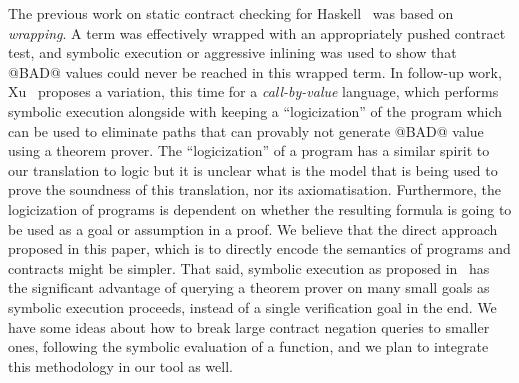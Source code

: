 The previous work on static contract checking for Haskell~\cite{xu+:contracts}
was based on {\em wrapping}. A term was effectively wrapped
with an appropriately pushed contract test, and symbolic execution or aggressive inlining was used to show that @BAD@ values could
never be reached in this wrapped term.
In follow-up work, Xu~\cite{Xu:2012:HCC:2103746.2103767} proposes a variation, this time for a
{\em call-by-value} language, which performs symbolic execution alongside with
keeping a ``logicization'' of the program which can be used to eliminate paths that can
provably not generate @BAD@ value using a theorem prover. The ``logicization'' of a
program has a similar spirit to our translation to logic but
it is unclear what is the
model that is being used to prove the soundness of this translation, nor its
axiomatisation.
Furthermore, the logicization of programs is dependent on whether
the resulting formula is going to be used as a goal or assumption in a proof. We believe
that the direct approach proposed in this paper, which is to directly encode the semantics
of programs and contracts might be simpler. That said, symbolic execution as proposed
in~\cite{Xu:2012:HCC:2103746.2103767} has the significant advantage of querying a
theorem prover on many small goals as symbolic execution proceeds, instead of a
single verification goal in the end. We have some ideas about how to break large
contract negation queries to smaller ones, following the symbolic evaluation of
a function, and we plan to integrate this methodology in our tool as well.

